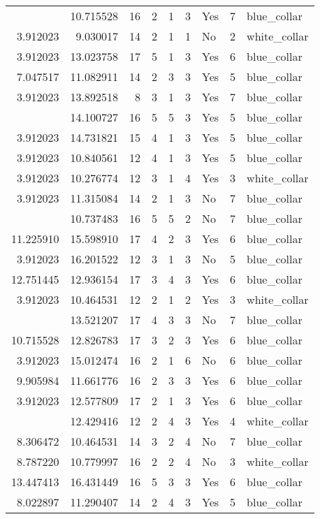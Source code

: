 \documentclass[
]{article}
\begin{document}
\begin{longtable}[t]{rrrrrllrl}
\addlinespace
3.912023 & 10.715528 & 16 & 2 & 1 & 3 & Yes & 7 & blue\_collar\\
3.912023 & 9.030017 & 14 & 2 & 1 & 1 & No & 2 & white\_collar\\
3.912023 & 13.023758 & 17 & 5 & 1 & 3 & Yes & 6 & blue\_collar\\
7.047517 & 11.082911 & 14 & 2 & 3 & 3 & Yes & 5 & blue\_collar\\
3.912023 & 13.892518 & 8 & 3 & 1 & 3 & Yes & 7 & blue\_collar\\
\addlinespace
10.915997 & 14.100727 & 16 & 5 & 5 & 3 & Yes & 5 & blue\_collar\\
3.912023 & 14.731821 & 15 & 4 & 1 & 3 & Yes & 5 & blue\_collar\\
3.912023 & 10.840561 & 12 & 4 & 1 & 3 & Yes & 5 & blue\_collar\\
3.912023 & 10.276774 & 12 & 3 & 1 & 4 & Yes & 3 & white\_collar\\
3.912023 & 11.315084 & 14 & 2 & 1 & 3 & No & 7 & blue\_collar\\
\addlinespace
5.010635 & 10.737483 & 16 & 5 & 5 & 2 & No & 7 & blue\_collar\\
11.225910 & 15.598910 & 17 & 4 & 2 & 3 & Yes & 6 & blue\_collar\\
3.912023 & 16.201522 & 12 & 3 & 1 & 3 & No & 5 & blue\_collar\\
12.751445 & 12.936154 & 17 & 3 & 4 & 3 & Yes & 6 & blue\_collar\\
3.912023 & 10.464531 & 12 & 2 & 1 & 2 & Yes & 3 & white\_collar\\
\addlinespace
12.676232 & 13.521207 & 17 & 4 & 3 & 3 & No & 7 & blue\_collar\\
10.715528 & 12.826783 & 17 & 3 & 2 & 3 & Yes & 6 & blue\_collar\\
3.912023 & 15.012474 & 16 & 2 & 1 & 6 & No & 6 & blue\_collar\\
9.905984 & 11.661776 & 16 & 2 & 3 & 3 & Yes & 6 & blue\_collar\\
3.912023 & 12.577809 & 17 & 2 & 1 & 3 & Yes & 6 & blue\_collar\\
\addlinespace
8.022897 & 12.429416 & 12 & 2 & 4 & 3 & Yes & 4 & white\_collar\\
8.306472 & 10.464531 & 14 & 3 & 2 & 4 & No & 7 & blue\_collar\\
8.787220 & 10.779997 & 16 & 2 & 2 & 4 & No & 3 & white\_collar\\
13.447413 & 16.431449 & 16 & 5 & 3 & 3 & Yes & 6 & blue\_collar\\
8.022897 & 11.290407 & 14 & 2 & 4 & 3 & Yes & 5 & blue\_collar\\

\end{longtable}
\end{document}
